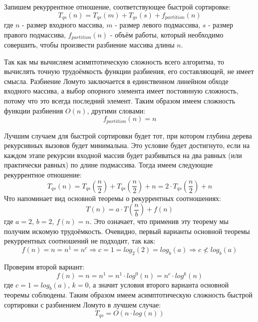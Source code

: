 Запишем рекуррентное отношение, соответствующее быстрой сортировке:
\begin{equation}
    T_{qs}(n) = T_{qs}(m) + T_{qs}(s) + f_{partition}(n)
\end{equation}
где $n$ - размер входного массива, $m$ - размер левого подмассива, $s$ - размер правого подмассива, $f_{partition}(n)$ - объём работы, который необходимо совершить, чтобы произвести разбиение массива длины $n$.

Так как мы вычисляем асимптотическую сложность всего алгоритма, то вычислять точную трудоёмкость функции разбиения, его составляющей, не имеет смысла. Разбиение Ломуто заключается в единственном линейном обходе входного массива, а выбор опорного элемента имеет постоянную сложность, потому что это всегда последний элемент. Таким образом имеем сложность функции разбиения $O(n)$, другими словами:
\begin{equation}
    f_{partition}(n) = n
\end{equation}

Лучшим случаем для быстрой сортировки будет тот, при котором глубина дерева рекурсивных вызовов будет минимальна. Это условие будет достигнуто, если на каждом этапе рекурсии входной массив будет разбиваться на два равных (или практически равных) по длине подмассива. Тогда имеем следующие рекуррентное отношение:
\begin{equation}
    T_{qs}(n) = T_{qs}(\frac{n}{2}) + T_{qs}(\frac{n}{2}) + n = 2 \cdot{} T_{qs}(\frac{n}{2}) + n
\end{equation}
Что напоминает вид основной теоремы о рекуррентных соотношениях:
\begin{equation}
    T(n) = a \cdot{} T(\frac{n}{b}) + f(n)
\end{equation}
где $a = 2$, $b = 2$, $f(n) = n$. Это означает, что применив эту теорему мы получим искомую трудоёмкость. Очевидно, первый варианты основной теоремы рекуррентных соотношений не подходит, так как:
\begin{equation}
    f(n) = n = n^1 = n^c \Rightarrow{} c = 1 = log_2(2) = log_b(a) \Rightarrow c \nless{} log_b(a)
\end{equation}

Проверим второй вариант:
\begin{equation}
    f(n) = n = n^1 = n^1 \cdot{} log^0(n) = n^c \cdot{} log^k(n)
\end{equation}
где $c = 1 = log_b(a)$, $k = 0$, а значит условия второго варианта основной теоремы соблюдены. Таким образом имеем асимптотическую сложность быстрой сортировки с разбиением Ломуто в лучшем случае:
\begin{equation}
    T_{qs} = O(n \cdot{} log(n))
\end{equation}

